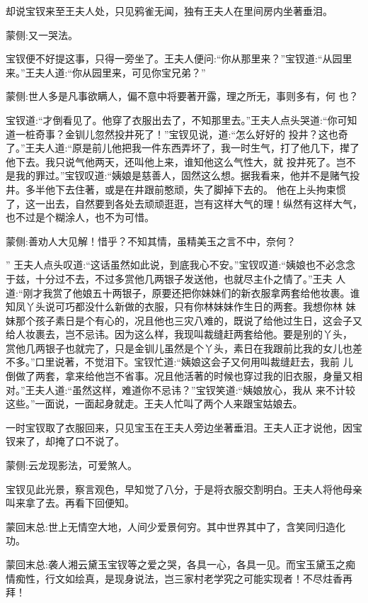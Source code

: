 \begin{parag}
    却说宝钗来至王夫人处，只见鸦雀无闻，独有王夫人在里间房内坐著垂泪。\begin{note}蒙侧:又一哭法。\end{note}宝钗便不好提这事，只得一旁坐了。王夫人便问:“你从那里来？”宝钗道:“从园里来。”王夫人道:“你从园里来，可见你宝兄弟？”\begin{note}蒙侧:世人多是凡事欲瞒人，偏不意中将要著开露，理之所无，事则多有，何 也？\end{note}宝钗道:“才倒看见了。他穿了衣服出去了，不知那里去。”王夫人点头哭道:“你可知道一桩奇事？金钏儿忽然投井死了！”宝钗见说，道:“怎么好好的 投井？这也奇了。”王夫人道:“原是前儿他把我一件东西弄坏了，我一时生气，打了他几下，撵了他下去。我只说气他两天，还叫他上来，谁知他这么气性大，就 投井死了。岂不是我的罪过。”宝钗叹道:“姨娘是慈善人，固然这么想。据我看来，他并不是赌气投井。多半他下去住著，或是在井跟前憨顽，失了脚掉下去的。 他在上头拘束惯了，这一出去，自然要到各处去顽顽逛逛，岂有这样大气的理！纵然有这样大气，也不过是个糊涂人，也不为可惜。\begin{note}蒙侧:善劝人大见解！惜乎？不知其情，虽精美玉之言不中，奈何？\end{note}” 王夫人点头叹道:“这话虽然如此说，到底我心不安。”宝钗叹道:“姨娘也不必念念于兹，十分过不去，不过多赏他几两银子发送他，也就尽主仆之情了。”王夫 人道:“刚才我赏了他娘五十两银子，原要还把你妹妹们的新衣服拿两套给他妆裹。谁知凤丫头说可巧都没什么新做的衣服，只有你林妹妹作生日的两套。我想你林 妹妹那个孩子素日是个有心的，况且他也三灾八难的，既说了给他过生日，这会子又给人妆裹去，岂不忌讳。因为这么样，我现叫裁缝赶两套给他。要是别的丫头， 赏他几两银子也就完了，只是金钏儿虽然是个丫头，素日在我跟前比我的女儿也差不多。”口里说著，不觉泪下。宝钗忙道:“姨娘这会子又何用叫裁缝赶去，我前 儿倒做了两套，拿来给他岂不省事。况且他活著的时候也穿过我的旧衣服，身量又相对。”王夫人道:“虽然这样，难道你不忌讳？”宝钗笑道:“姨娘放心，我从 来不计较这些。”一面说，一面起身就走。王夫人忙叫了两个人来跟宝姑娘去。
\end{parag}


\begin{parag}
    一时宝钗取了衣服回来，只见宝玉在王夫人旁边坐著垂泪。王夫人正才说他，因宝钗来了，却掩了口不说了。\begin{note}蒙侧:云龙现影法，可爱煞人。\end{note}宝钗见此光景，察言观色，早知觉了八分，于是将衣服交割明白。王夫人将他母亲叫来拿了去。再看下回便知。
\end{parag}


\begin{parag}
    \begin{note}蒙回末总:世上无情空大地，人间少爱景何穷。其中世界其中了，含笑同归造化功。\end{note}
\end{parag}


\begin{parag}
    \begin{note}蒙回末总:袭人湘云黛玉宝钗等之爱之哭，各具一心，各具一见。而宝玉黛玉之痴情痴性，行文如绘真，是现身说法，岂三家村老学究之可能实现者！不尽炷香再拜！\end{note}
\end{parag}

